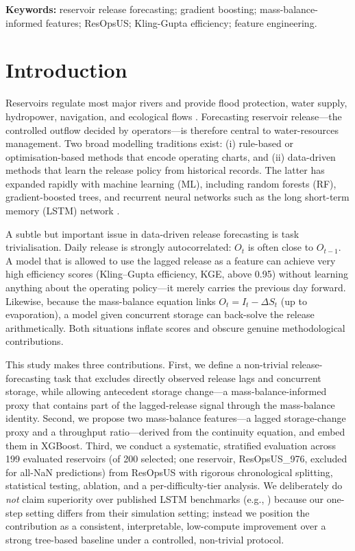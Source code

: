 \documentclass[journal]{ascelike-new}
\begin{document}
\noindent\textbf{Keywords:} reservoir release forecasting; gradient boosting; mass-balance-informed features; ResOpsUS; Kling-Gupta efficiency; feature engineering.

\section{Introduction}


Reservoirs regulate most major rivers and provide flood protection, water supply, hydropower, navigation, and ecological flows \citep{Steyaert2022}. Forecasting reservoir release---the controlled outflow decided by operators---is therefore central to water-resources management. Two broad modelling traditions exist: (i) rule-based or optimisation-based methods that encode operating charts, and (ii) data-driven methods that learn the release policy from historical records. The latter has expanded rapidly with machine learning (ML), including random forests (RF), gradient-boosted trees, and recurrent neural networks such as the long short-term memory (LSTM) network \citep{Kratzert2018}.


A subtle but important issue in data-driven release forecasting is task trivialisation. Daily release is strongly autocorrelated: $O_t$ is often close to $O_{t-1}$. A model that is allowed to use the lagged release as a feature can achieve very high efficiency scores (Kling--Gupta efficiency, KGE, above 0.95) without learning anything about the operating policy---it merely carries the previous day forward. Likewise, because the mass-balance equation links $O_t = I_t - \Delta S_t$ (up to evaporation), a model given concurrent storage can back-solve the release arithmetically. Both situations inflate scores and obscure genuine methodological contributions.


This study makes three contributions. First, we define a non-trivial release-forecasting task that excludes directly observed release lags and concurrent storage, while allowing antecedent storage change---a mass-balance-informed proxy that contains part of the lagged-release signal through the mass-balance identity. Second, we propose two mass-balance features---a lagged storage-change proxy and a throughput ratio---derived from the continuity equation, and embed them in XGBoost. Third, we conduct a systematic, stratified evaluation across 199 evaluated reservoirs (of 200 selected; one reservoir, ResOpsUS\_976, excluded for all-NaN predictions) from ResOpsUS with rigorous chronological splitting, statistical testing, ablation, and a per-difficulty-tier analysis. We deliberately do \emph{not} claim superiority over published LSTM benchmarks (e.g., \citet{Kratzert2018,Kratzert2019}) because our one-step setting differs from their simulation setting; instead we position the contribution as a consistent, interpretable, low-compute improvement over a strong tree-based baseline under a controlled, non-trivial protocol.
\end{document}
